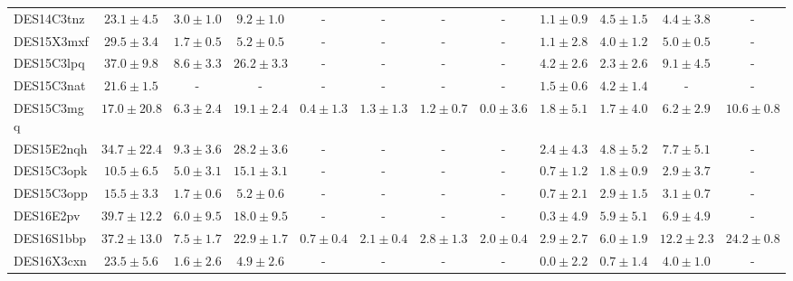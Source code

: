 \documentclass[fleqn,usenatbib,]{mnras}
\begin{document}
\begin{table}
\begin{tabular}{lccccccccccc}
DES14C3tnz &   $23.1 \pm 4.5$ &    $3.0 \pm 1.0$ &     $9.2 \pm 1.0$ &               - &               - &               - &               - &   $1.1 \pm 0.9$ &    $4.5 \pm 1.5$ &    $4.4 \pm 3.8$ &                - \\
DES15X3mxf &   $29.5 \pm 3.4$ &    $1.7 \pm 0.5$ &     $5.2 \pm 0.5$ &               - &               - &               - &               - &   $1.1 \pm 2.8$ &    $4.0 \pm 1.2$ &    $5.0 \pm 0.5$ &                - \\
DES15C3lpq &   $37.0 \pm 9.8$ &    $8.6 \pm 3.3$ &    $26.2 \pm 3.3$ &               - &               - &               - &               - &   $4.2 \pm 2.6$ &    $2.3 \pm 2.6$ &    $9.1 \pm 4.5$ &                - \\
DES15C3nat &   $21.6 \pm 1.5$ &                - &                 - &               - &               - &               - &               - &   $1.5 \pm 0.6$ &    $4.2 \pm 1.4$ &                - &                - \\
DES15C3mgq &  $17.0 \pm 20.8$ &    $6.3 \pm 2.4$ &    $19.1 \pm 2.4$ &   $0.4 \pm 1.3$ &   $1.3 \pm 1.3$ &   $1.2 \pm 0.7$ &   $0.0 \pm 3.6$ &   $1.8 \pm 5.1$ &    $1.7 \pm 4.0$ &    $6.2 \pm 2.9$ &   $10.6 \pm 0.8$ \\
DES15E2nqh &  $34.7 \pm 22.4$ &    $9.3 \pm 3.6$ &    $28.2 \pm 3.6$ &               - &               - &               - &               - &   $2.4 \pm 4.3$ &    $4.8 \pm 5.2$ &    $7.7 \pm 5.1$ &                - \\
DES15C3opk &   $10.5 \pm 6.5$ &    $5.0 \pm 3.1$ &    $15.1 \pm 3.1$ &               - &               - &               - &               - &   $0.7 \pm 1.2$ &    $1.8 \pm 0.9$ &    $2.9 \pm 3.7$ &                - \\
DES15C3opp &   $15.5 \pm 3.3$ &    $1.7 \pm 0.6$ &     $5.2 \pm 0.6$ &               - &               - &               - &               - &   $0.7 \pm 2.1$ &    $2.9 \pm 1.5$ &    $3.1 \pm 0.7$ &                - \\
DES16E2pv  &  $39.7 \pm 12.2$ &    $6.0 \pm 9.5$ &    $18.0 \pm 9.5$ &               - &               - &               - &               - &   $0.3 \pm 4.9$ &    $5.9 \pm 5.1$ &    $6.9 \pm 4.9$ &                - \\
DES16S1bbp &  $37.2 \pm 13.0$ &    $7.5 \pm 1.7$ &    $22.9 \pm 1.7$ &   $0.7 \pm 0.4$ &   $2.1 \pm 0.4$ &   $2.8 \pm 1.3$ &   $2.0 \pm 0.4$ &   $2.9 \pm 2.7$ &    $6.0 \pm 1.9$ &   $12.2 \pm 2.3$ &   $24.2 \pm 0.8$ \\
DES16X3cxn &   $23.5 \pm 5.6$ &    $1.6 \pm 2.6$ &     $4.9 \pm 2.6$ &               - &               - &               - &               - &   $0.0 \pm 2.2$ &    $0.7 \pm 1.4$ &    $4.0 \pm 1.0$ &                - \\

\end{tabular}
\end{table}
\end{document}
